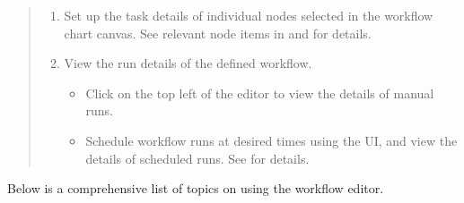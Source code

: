 \documentclass[letterpaper,10pt,english]{sphinxmanual}
\begin{document}
\begin{quote}
\begin{enumerate}
\item {} 
 Set up the task details of individual nodes selected in the workflow chart canvas. See relevant node items in {\hyperref[\detokenize{integrator/part03/tasks:action-nodes}]{}} and {\hyperref[\detokenize{integrator/part03/control_flow:control-flow-nodes}]{}} for details.

\item {} 
 View the run details of the defined workflow.
\begin{itemize}
\item {} 
 Click  on the top left of the editor to view the details of manual runs.

\item {} 
 Schedule workflow runs at desired times using the UI, and view the details of scheduled runs. See {\hyperref[\detokenize{integrator/part03/scheduled_run:scheduled-run}]{}} for details.

\end{itemize}

\end{enumerate}
\end{quote}

Below is a comprehensive list of topics on using the workflow editor.
\end{document}
